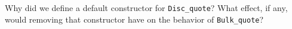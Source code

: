 %
%
\begin{question}
Why did we define a default constructor for \verb|Disc_quote|?
What effect, if any, would removing that constructor have on the behavior of \verb|Bulk_quote|?
\end{question}
